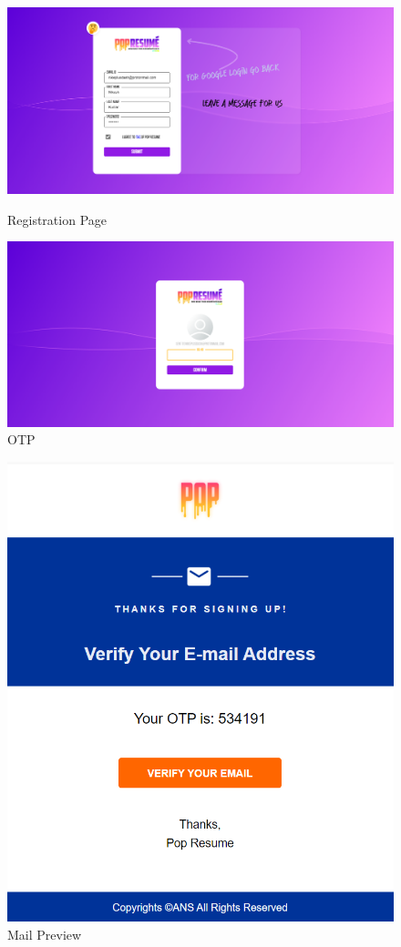 \documentclass[12pt]{article}
\begin{document}
\begin{figure}[H]
    \begin{minipage}{0.47\textwidth}
        \centering
        \includegraphics[width=\linewidth]{Screenshot 2021-06-07 051600.png}
        \caption{Registration Page}
    \end{minipage}\hfill
    \begin{minipage}{0.47\textwidth}
        \centering
        \includegraphics[width=\linewidth]{Screenshot 2021-06-07 051626.png}
        \caption{OTP}
    \end{minipage}
\end{figure}
\begin{figure}[H]
\centering
\includegraphics[width=0.5\linewidth]{Screenshot 2021-06-07 051656.png}
\caption{Mail Preview}
\end{figure}
\end{document}
